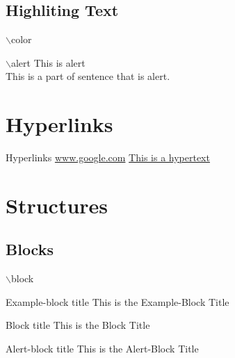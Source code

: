 \documentclass{beamer}
\begin{document}
    \subsection{Highliting Text}
    \begin{frame}{$\backslash$color}
    \end{frame}

    \begin{frame}{$\backslash$alert}
        \alert{This is alert}   \pause \\
        This is a \alert{part} of sentence that is alert.
        
    \end{frame}
    
    \section{Hyperlinks}
    \begin{frame}{Hyperlinks}
        \url{www.google.com}
        \vfill
        \href{www.google.com}{This is a hypertext}
        \vfill
        \hyperlink{Test_label}{}
    \end{frame}
    
    \section{Structures}
    
    \subsection{Blocks}
    \begin{frame}{$\backslash$block}
    
        \begin{exampleblock}{Example-block title}
        This is the Example-Block Title
        \end{exampleblock}
        \pause
    
        \begin{block}{Block title}
        This is the Block Title
        \end{block}
        \pause
        
        \begin{alertblock}{Alert-block title}
        This is the Alert-Block Title
        \end{alertblock}
    \end{frame}
    
\end{document}
